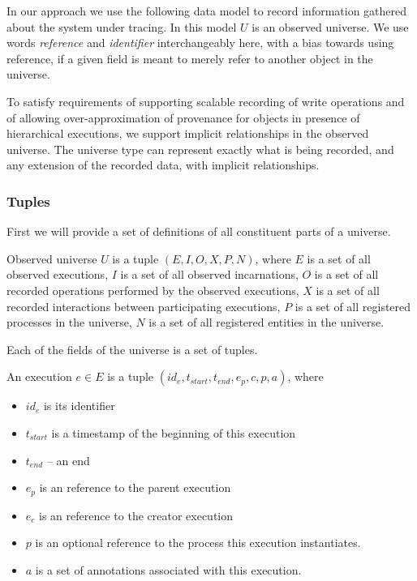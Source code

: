 In our approach we use the following data model to record information gathered about the system under tracing. In this model $U$ is an observed universe. We use words \textit{reference} and \textit{identifier} interchangeably here, with a bias towards using reference, if a given field is meant to merely refer to another object in the universe.

To satisfy requirements of supporting scalable recording of write operations and of allowing over-approximation of provenance for objects in presence of hierarchical executions, we support implicit relationships in the observed universe. The universe type can represent exactly what is being recorded, and any extension of the recorded data, with implicit relationships.

\subsubsection{Tuples}\label{sec:global-tuples}

First we will provide a set of definitions of all constituent parts of a universe.
%
\begin{definition}\label{def:observed-universe}
Observed universe $U$ is a tuple $(E, I, O, X, P, N)$, where $E$ is a set of all observed executions, $I$ is a set of all observed incarnations, $O$ is a set of all recorded operations performed by the observed executions, $X$ is a set of all recorded interactions between participating executions, $P$ is a set of all registered processes in the universe, $N$ is a set of all registered entities in the universe.
\end{definition}

Each of the fields of the universe is a set of tuples.

\begin{definition}[Execution]
An execution $e \in E$ is a tuple $(id_e, t_{start}, t_{end}, e_p, c, p, a)$, where
\begin{itemize}
	\item $id_{e}$ is its identifier
	\item $t_{start}$ is a timestamp of the beginning of this execution
	\item $t_{end}$ -- an end
	\item $e_p$ is an reference to the parent execution
	\item $e_c$ is an reference to the creator execution
	\item $p$ is an optional reference to the process this execution instantiates.
	\item $a$ is a set of annotations associated with this execution.
\end{itemize}
\end{definition}

